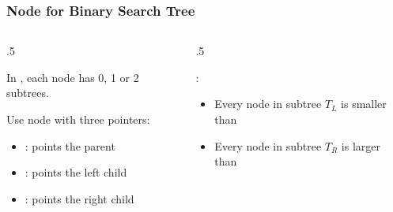 \documentclass[10pt]{beamer}
\begin{document}




\begin{frame}[t]\frametitle{Node for Binary Search Tree}
	\vspace{-0.3cm}
	\begin{columns}[T] %
	\begin{column}{.5\linewidth} %
		{\tiny 
		
		} %

		{\footnotesize
			In , 
			each node has 0, 1 or 2 subtrees.
					
			Use node with three pointers:
			\begin{itemize}
			
				\item
				: points the parent
			
				\item
				: points the left child
			
				\item
				: points the right child
				
			\end{itemize}				
		} %

		
	\end{column} %
	\begin{column}{.5\linewidth} %
		{\tiny
		\begin{center}
		\vspace{-0.5cm}
		
		\end{center}
		} %

		{\footnotesize			
			:
			\begin{itemize}
			
				\item
				Every node in subtree $T_{L}$ is smaller than 
			
				\item
				Every node in subtree $T_{R}$ is larger than 
						
			\end{itemize}
			
			\\
			\\
			
		} %
	\end{column} %
	\end{columns} %
\end{frame}
\end{document}
